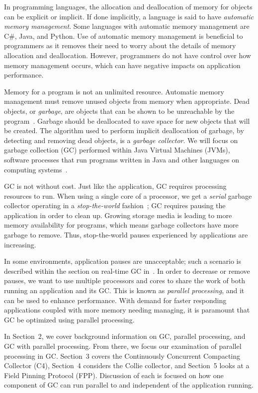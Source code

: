 \documentclass{sig-alternate}
\begin{document}
In programming languages, the allocation and deallocation
of memory for objects can be explicit or implicit. If done implicitly,
a language is said to have \emph{automatic memory management}. Some languages 
with automatic memory management are C\#, Java, and Python.
Use of automatic memory management is beneficial to programmers as it 
removes their need to worry about the details of memory allocation and deallocation. 
However, programmers do not have control over how memory management occurs,
which can have negative impacts on application performance.

Memory for a program is not an unlimited resource. Automatic memory management
must remove unused objects from memory when appropriate.
Dead objects, or \emph{garbage}, are objects that can be shown
to be unreachable by the program~\cite{Lindblom:2011}. Garbage should be deallocated to 
save space for new objects that will be created. The algorithm used to perform implicit
deallocation of garbage, by detecting and removing dead objects, 
is a \emph{garbage collector}.
We will focus on
garbage collection (GC) performed within Java Virtual Machines 
(JVMs), software processes that run programs written in Java and other languages 
on computing systems~\cite{Lindblom:2011}.

GC is not without cost.
Just like the application, GC requires processing resources to run. When using a single core of a processor, 
we get a \emph{serial} garbage collector operating in a 
\emph{stop-the-world} fashion~\cite{Lindblom:2011}; GC requires
pausing the application in order to clean up. 
Growing storage media is leading to more memory
availability for programs, which means garbage collectors
have more garbage to remove. Thus, stop-the-world pauses
experienced by applications are increasing.

In some environments,
application pauses are unacceptable; such a scenario is described within the section on 
real-time GC in~\cite{Lindblom:2011}. In order to decrease or remove 
pauses, we want to use multiple
processors and cores to share the work of both running an application and its GC.
This is known as \emph{parallel processing}, and it can be used
to enhance performance. With
demand for faster responding applications coupled with more memory needing managing,
it is paramount that GC be optimized using parallel processing. 

In Section~2, we cover background information on GC, parallel processing,
and GC with parallel processing.
From there, we focus our examination of parallel processing in GC.
Section~3 covers the Continuously Concurrent Compacting Collector (C4), 
Section~4 considers the Collie collector, and Section~5 looks at a Field Pinning Protocol (FPP).
Discussion of each is focused on how one component of GC can run parallel to
and independent of the application running. 
\end{document}
